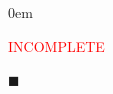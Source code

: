\documentclass[12pt]{article}
\renewcommand{\qed}{\hfill$\blacksquare$}
\renewenvironment{proof}{\begin{addmargin}[1em]{0em}\begin{newproof}}{\end{newproof}\end{addmargin}\qed}
\newenvironment{proposition}[2][Proposition]{\begin{trivlist}
\item[\hskip \labelsep {\bfseries #1}\hskip \labelsep {\bfseries #2.}]}{\end{trivlist}}
\begin{document}
\begin{proof}
    \textcolor{red}{INCOMPLETE}
\end{proof}



\end{document}
